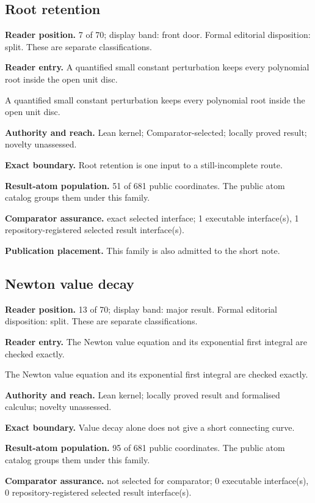 \documentclass[11pt]{article}
\begin{document}
\subsection{Root retention}
\textbf{Reader position.} 7 of 70; display band: front door.  Formal editorial disposition: split.  These are separate classifications.

\textbf{Reader entry.} A quantified small constant perturbation keeps every polynomial root inside the open unit disc.

A quantified small constant perturbation keeps every polynomial root inside the open unit disc.

\textbf{Authority and reach.} Lean kernel; Comparator-selected; locally proved result; novelty unassessed.

\textbf{Exact boundary.} Root retention is one input to a still-incomplete route.

\textbf{Result-atom population.} 51 of 681 public coordinates. The public atom catalog groups them under this family.

\textbf{Comparator assurance.} exact selected interface; 1 executable interface(s), 1 repository-registered selected result interface(s).

\textbf{Publication placement.} This family is also admitted to the short note.

\subsection{Newton value decay}
\textbf{Reader position.} 13 of 70; display band: major result.  Formal editorial disposition: split.  These are separate classifications.

\textbf{Reader entry.} The Newton value equation and its exponential first integral are checked exactly.

The Newton value equation and its exponential first integral are checked exactly.

\textbf{Authority and reach.} Lean kernel; locally proved result and formalised calculus; novelty unassessed.

\textbf{Exact boundary.} Value decay alone does not give a short connecting curve.

\textbf{Result-atom population.} 95 of 681 public coordinates. The public atom catalog groups them under this family.

\textbf{Comparator assurance.} not selected for comparator; 0 executable interface(s), 0 repository-registered selected result interface(s).
\end{document}
